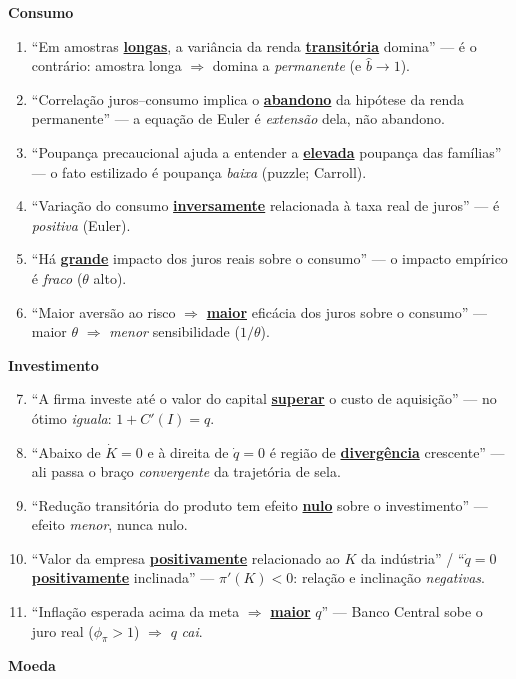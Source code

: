 \documentclass[12pt, a4paper]{article}
\newcommand{\mata}[1]{\textcolor{redf}{\underline{\textbf{#1}}}}
\begin{document}
\begin{falsebox}[title={Se aparecer parecido com isto, é F --- o erro está sublinhado}]
\textbf{Consumo}
\begin{enumerate}[leftmargin=1.6em, itemsep=0.15em, topsep=0.2em]
\item ``Em amostras \mata{longas}, a variância da renda \mata{transitória}
domina'' --- é o contrário: amostra longa $\Rightarrow$ domina a
\emph{permanente} (e $\hat b \to 1$).
\item ``Correlação juros--consumo implica o \mata{abandono} da hipótese da
renda permanente'' --- a equação de Euler é \emph{extensão} dela, não
abandono.
\item ``Poupança precaucional ajuda a entender a \mata{elevada} poupança das
famílias'' --- o fato estilizado é poupança \emph{baixa} (puzzle; Carroll).
\item ``Variação do consumo \mata{inversamente} relacionada à taxa real de
juros'' --- é \emph{positiva} (Euler).
\item ``Há \mata{grande} impacto dos juros reais sobre o consumo'' --- o
impacto empírico é \emph{fraco} ($\theta$ alto).
\item ``Maior aversão ao risco $\Rightarrow$ \mata{maior} eficácia dos juros
sobre o consumo'' --- maior $\theta$ $\Rightarrow$ \emph{menor} sensibilidade
($1/\theta$).
\end{enumerate}
\textbf{Investimento}
\begin{enumerate}[leftmargin=1.6em, itemsep=0.15em, topsep=0.2em]
\setcounter{enumi}{6}
\item ``A firma investe até o valor do capital \mata{superar} o custo de
aquisição'' --- no ótimo \emph{iguala}: $1 + C'(I) = q$.
\item ``Abaixo de $\dot K=0$ e à direita de $\dot q=0$ é região de
\mata{divergência} crescente'' --- ali passa o braço \emph{convergente} da
trajetória de sela.
\item ``Redução transitória do produto tem efeito \mata{nulo} sobre o
investimento'' --- efeito \emph{menor}, nunca nulo.
\item ``Valor da empresa \mata{positivamente} relacionado ao $K$ da
indústria'' / ``$\dot q = 0$ \mata{positivamente} inclinada'' --- $\pi'(K)<0$:
relação e inclinação \emph{negativas}.
\item ``Inflação esperada acima da meta $\Rightarrow$ \mata{maior} $q$'' ---
Banco Central sobe o juro real ($\phi_\pi>1$) $\Rightarrow$ $q$ \emph{cai}.
\end{enumerate}
\textbf{Moeda}

\end{falsebox}
\end{document}
